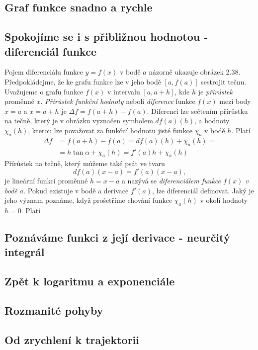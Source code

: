     \subsection{Graf funkce snadno a rychle}\label{mai:IchapIIIsecVIIssecII}
    \subsection{Spokojíme se i s přibližnou hodnotou - diferenciál funkce}\label{mai:IchapIIIsecVIIssecIII}
      Pojem diferenciálu funkce \(y = f(x)\) v bodě \(a\) názorně ukazuje obrázek 2.38.
      Předpokládejme, že ke grafu funkce lze v jeho bodě \([a, f(a)]\) sestrojit tečnu. Uvažujeme o
      grafu funkce \(f(x)\) v intervalu \([a, a+h]\), kde \(h\) je \emph{přírůstek} proměnné \(x\).
      \emph{Přírůstek funkční hodnoty} neboli \emph{diference} funkce \(f(x)\) mezi body \(x = a\) a
      \(x = a+h\) je \(\Delta f = f(a+h)-f(a)\). Diferenci lze  sečtením přírůstku na
      tečně, který je v obrázku vyznačen symbolem \(df(a)(h)\), a hodnoty \(\chi_a(h)\), kterou lze
      považovat za funkční hodnotu jisté funkce \(\chi_a\) v bodě \(h\). Platí
      \begin{align}
        \Delta f &= f(a+h) - f(a) = df(a)(h) + \chi_a(h) =                   \nonumber      \\
                 &= h\tan\alpha+\chi_a(h) = f'(a)h + \chi_a(h)               \label{mai:eq093}
      \end{align}  
      Přírůstek na tečně, který můžeme také psát ve tvaru
      \begin{equation}\label{mai:eq094}
        df(a)(x-a) = f'(a)(x-a),
      \end{equation}
      je lineární funkcí proměnné \(h = x - a\) a nazývá se \emph{diferenciálem funkce \(f(x)\) v
      bodě \(a\)}. Pokud existuje v bodě a derivace \(f'(a)\), lze diferenciál definovat. Jaký je
      jeho význam poznáme, když prošetříme chování funkce \(\chi_a(h)\) v okolí hodnoty \(h = 0\).
      Platí

    \subsection{Poznáváme funkci z její derivace - neurčitý integrál}\label{mai:IchapIIIsecVssecIV}
    \subsection{Zpět k logaritmu a exponenciále}\label{mai:IchapIIIsecVssecV}
    \subsection{Rozmanité pohyby}\label{mai:IchapIIIsecVssecVI}
    \subsection{Od zrychlení k trajektorii}\label{mai:IchapIIIsecVssecVII}
  
